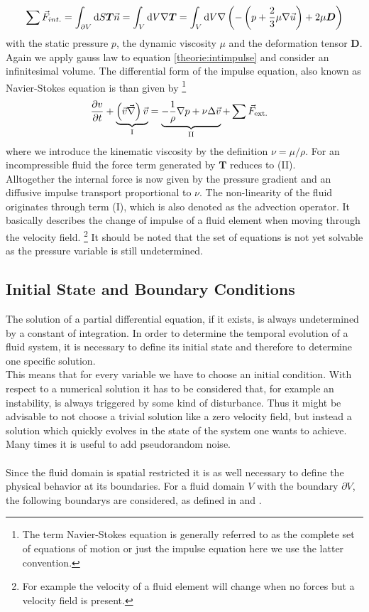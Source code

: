 \begin{align}
    \sum \vec{F}_{int.} = \int_{\partial V}\mathop{}\!\mathrm{d} S \bm{T}\vec{n}  = \int_{V} \mathop{}\!\mathrm{d} V \nabla \bm{T} =
     \int_{V} \mathop{}\!\mathrm{d} V \nabla \left(- \left(p + \frac{2}{3}\mu\nabla\vec{u} \right) + 2\mu \bm{D} \right)
\end{align}
with the static pressure $p$, the dynamic viscosity $\mu$ and the deformation tensor $\bm{D}$.
Again we apply gauss law to equation \ref{theorie:intimpulse} and consider an infinitesimal volume.
The differential form of the impulse equation, also known as Navier-Stokes equation is than given by
\footnote{The term Navier-Stokes equation is generally referred to as the complete set of equations of motion or
just the impulse equation here we use the latter convention.}
\begin{align}
    \label{theorie:eqns}
    \pdn[v]{t} + \underbrace{\left(\vec{v} \vec{\nabla}\right) \vec{v}}_{\text{I}} &= \underbrace{- \frac{1}{\rho} \nabla p + \nu \Delta \vec{v}}_{\text{II}} +\sum \vec{F}_{\text{ext.}}
\end{align}
where we introduce the kinematic viscosity by the definition $\nu = \mu/\rho$.
For an incompressible fluid the force term generated by $\bm{T}$ reduces to (II).\\
Alltogether the internal force is now given by the pressure gradient and an diffusive impulse transport proportional to $\nu$.
The non-linearity of the fluid originates through term (I), which is also denoted as the advection operator.
It basically describes the change of impulse of a fluid element when moving through the velocity field.
\footnote{For example the velocity of a fluid element will change when no forces but a velocity field is present.}
It should be noted that the set of equations is not yet solvable as the pressure variable is still undetermined.

\subsection{Initial State and Boundary Conditions}

The solution of a partial differential equation, if it exists, is always undetermined by a constant of integration.
In order to determine the temporal evolution of a fluid system, it is necessary to define its initial state and therefore
to determine one specific solution.\\
This means that for every variable we have to choose an initial condition.
With respect to a numerical solution it has to be considered that, for example an instability, is always triggered by some kind of disturbance.
Thus it might be advisable to not choose a trivial solution like a zero velocity field, but instead a solution which quickly evolves in the state
of the system one wants to achieve. Many times it is useful to add pseudorandom noise.\\
\\
Since the fluid domain is spatial restricted it is as well necessary to define the physical behavior at its boundaries.
For a fluid domain $V$ with the boundary $\partial V$, the following boundarys are considered, as defined in \citep{Griebel1998} and \citep{ferziger99}.


